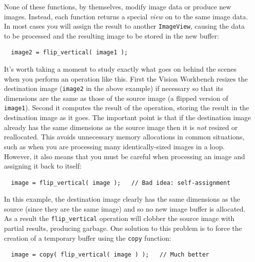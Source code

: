 None of these functions, by themselves, modify image data or produce 
new images.  Instead, each function returns a special {\it view} 
on to the same image data.  In most cases you will assign the result 
to another \verb#ImageView#, causing the data to be processed and 
the resulting image to be stored in the new buffer:
\begin{verbatim}
  image2 = flip_vertical( image1 );
\end{verbatim}
It's worth taking a moment to study exactly what goes on behind 
the scenes when you perform an operation like this.  First the 
Vision Workbench resizes the destination image (\verb#image2# 
in the above example) if necessary so that its dimensions are 
the same as those of the source image (a flipped version of 
\verb#image1#).  Second it computes the result of the operation, 
storing the result in the destination image as it goes.  The 
important point is that if the destination image already has the 
same dimensions as the source image then it is {\it not} resized 
or reallocated.  This avoids unnecessary memory allocations in 
common situations, such as when you are processing many 
identically-sized images in a loop.  However, it also means that 
you must be careful when processing an image and assigning it back 
to itself:
\begin{verbatim}
  image = flip_vertical( image );   // Bad idea: self-assignment
\end{verbatim}
In this example, the destination image clearly has the same 
dimensions as the source (since they are the same image) and so 
no new image buffer is allocated.  As a result the 
\verb#flip_vertical# operation will clobber the source image with 
partial results, producing garbage.  One solution to this problem 
is to force the creation of a temporary buffer using the \verb#copy# 
function:
\begin{verbatim}
  image = copy( flip_vertical( image ) );   // Much better
\end{verbatim}

